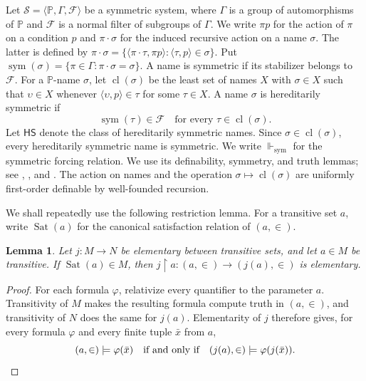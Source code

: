 \documentclass[11pt,a4paper]{amsart}
\newcommand{\HS}{\mathsf{HS}}
\newcommand{\sym}{\operatorname{sym}}
\newcommand{\forcesS}{\Vdash_{\mathrm{sym}}}
\newcommand{\restr}{\mathbin{\upharpoonright}}
\theoremstyle{plain}
\newtheorem{lemma}[theorem]{Lemma}
\theoremstyle{definition}
\theoremstyle{remark}
\begin{document}
Let $\mathscr S=\langle\mathbb P,\Gamma,\mathcal F\rangle$ be a symmetric system, where $\Gamma$ is a group of automorphisms of $\mathbb P$ and $\mathcal F$ is a normal filter of subgroups of $\Gamma$.  We write $\pi p$ for the action of $\pi$ on a condition $p$ and $\pi\cdot\sigma$ for the induced recursive action on a name $\sigma$.  The latter is defined by
$\pi\cdot\sigma=\{\langle\pi\cdot\tau,\pi p\rangle:\langle\tau,p\rangle\in\sigma\}$.  Put $\sym(\sigma)=\{\pi\in\Gamma:\pi\cdot\sigma=\sigma\}$.  A name is symmetric if its stabilizer belongs to $\mathcal F$.  For a $\mathbb P$-name $\sigma$, let $\operatorname{cl}(\sigma)$ be the least set of names $X$ with $\sigma\in X$ such that $\upsilon\in X$ whenever $\langle\upsilon,p\rangle\in\tau$ for some $\tau\in X$.  A name $\sigma$ is hereditarily symmetric if
\begin{equation}\label{eq:HS-characterization}
\sym(\tau)\in\mathcal F\quad\text{for every }\tau\in\operatorname{cl}(\sigma).
\end{equation}
Let $\HS$ denote the class of hereditarily symmetric names.  Since $\sigma\in\operatorname{cl}(\sigma)$, every hereditarily symmetric name is symmetric.  We write $\forcesS$ for the symmetric forcing relation.  We use its definability, symmetry, and truth lemmas; see \cite[Chapter~5]{Jech}, \cite[Section~2]{Karagila}, and {\cite[Lemma~2.2 and Theorem~2.5]{HayutKaragilaSmall}}.  The action on names and the operation $\sigma\mapsto\operatorname{cl}(\sigma)$ are uniformly first-order definable by well-founded recursion.

We shall repeatedly use the following restriction lemma.  For a transitive set $a$, write $\operatorname{Sat}(a)$ for the canonical satisfaction relation of $(a,\in)$.

\begin{lemma}\label{lem:restriction-elementarity}
Let $j:M\to N$ be elementary between transitive sets, and let $a\in M$ be transitive.  If $\operatorname{Sat}(a)\in M$, then $j\restr a:(a,\in)\longrightarrow(j(a),\in)$ is elementary.
\end{lemma}

\begin{proof}
{\color{auditgreen}
For each formula $\varphi$, relativize every quantifier to the parameter $a$.  Transitivity of $M$ makes the resulting formula compute truth in $(a,\in)$, and transitivity of $N$ does the same for $j(a)$.  Elementarity of $j$ therefore gives, for every formula $\varphi$ and every finite tuple $\bar x$ from $a$,
}
\[
(a,\in)\models\varphi(\bar x)
\quad\text{if and only if}\quad
(j(a),\in)\models\varphi(j(\bar x)).\qedhere
\]
\end{proof}
\end{document}

